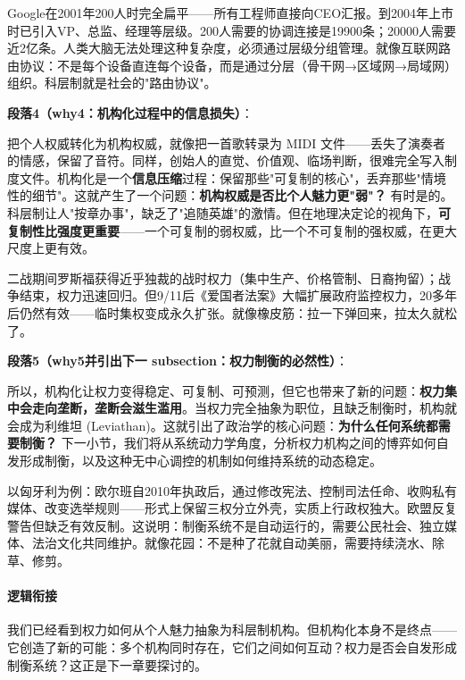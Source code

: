 \documentclass[../main.tex]{subfiles}
\begin{document}
	Google在2001年200人时完全扁平——所有工程师直接向CEO汇报。到2004年上市时已引入VP、总监、经理等层级。200人需要的协调连接是19900条；20000人需要近2亿条。人类大脑无法处理这种复杂度，必须通过层级分组管理。就像互联网路由协议：不是每个设备直连每个设备，而是通过分层（骨干网→区域网→局域网）组织。科层制就是社会的"路由协议"。

	\textbf{段落4（why4：机构化过程中的信息损失）}：  

	把个人权威转化为机构权威，就像把一首歌转录为 MIDI 文件——丢失了演奏者的情感，保留了音符。同样，创始人的直觉、价值观、临场判断，很难完全写入制度文件。机构化是一个\textbf{信息压缩}过程：保留那些"可复制的核心"，丢弃那些"情境性的细节"。这就产生了一个问题：\textbf{机构权威是否比个人魅力更"弱"？} 有时是的。科层制让人"按章办事"，缺乏了"追随英雄"的激情。但在地理决定论的视角下，\textbf{可复制性比强度更重要}——一个可复制的弱权威，比一个不可复制的强权威，在更大尺度上更有效。
	
	二战期间罗斯福获得近乎独裁的战时权力（集中生产、价格管制、日裔拘留）；战争结束，权力迅速回归。但9/11后《爱国者法案》大幅扩展政府监控权力，20多年后仍然有效——临时集权变成永久扩张。就像橡皮筋：拉一下弹回来，拉太久就松了。

	\textbf{段落5（why5并引出下一 subsection：权力制衡的必然性）}：  

	所以，机构化让权力变得稳定、可复制、可预测，但它也带来了新的问题：\textbf{权力集中会走向垄断，垄断会滋生滥用}。当权力完全抽象为职位，且缺乏制衡时，机构就会成为利维坦 (Leviathan)。这就引出了政治学的核心问题：\textbf{为什么任何系统都需要制衡？} 下一小节，我们将从系统动力学角度，分析权力机构之间的博弈如何自发形成制衡，以及这种无中心调控的机制如何维持系统的动态稳定。
	
	以匈牙利为例：欧尔班自2010年执政后，通过修改宪法、控制司法任命、收购私有媒体、改变选举规则——形式上保留三权分立外壳，实质上行政权独大。欧盟反复警告但缺乏有效反制。这说明：制衡系统不是自动运行的，需要公民社会、独立媒体、法治文化共同维护。就像花园：不是种了花就自动美丽，需要持续浇水、除草、修剪。

	\paragraph*{逻辑衔接}

	我们已经看到权力如何从个人魅力抽象为科层制机构。但机构化本身不是终点——它创造了新的可能：多个机构同时存在，它们之间如何互动？权力是否会自发形成制衡系统？这正是下一章要探讨的。
	
\end{document}
